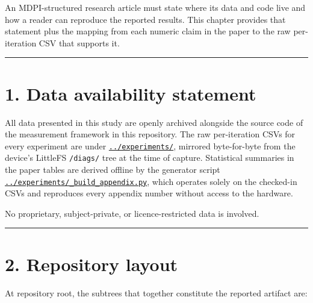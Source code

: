 An MDPI-structured research article must state where its data and code
live and how a reader can reproduce the reported results. This chapter
provides that statement plus the mapping from each numeric claim in the
paper to the raw per-iteration CSV that supports it.

\begin{center}\rule{0.5\linewidth}{0.5pt}\end{center}

\section{1. Data availability
statement}\label{data-availability-statement}

All data presented in this study are openly archived alongside the
source code of the measurement framework in this repository. The raw
per-iteration CSVs for every experiment are under
\href{../experiments/}{\texttt{../experiments/}}, mirrored byte-for-byte
from the device's LittleFS \texttt{/diags/} tree at the time of capture.
Statistical summaries in the paper tables are derived offline by the
generator script
\href{../experiments/_build_appendix.py}{\texttt{../experiments/\_build\_appendix.py}},
which operates solely on the checked-in CSVs and reproduces every
appendix number without access to the hardware.

No proprietary, subject-private, or licence-restricted data is involved.

\begin{center}\rule{0.5\linewidth}{0.5pt}\end{center}

\section{2. Repository layout}\label{repository-layout}

At repository root, the subtrees that together constitute the reported
artifact are:

